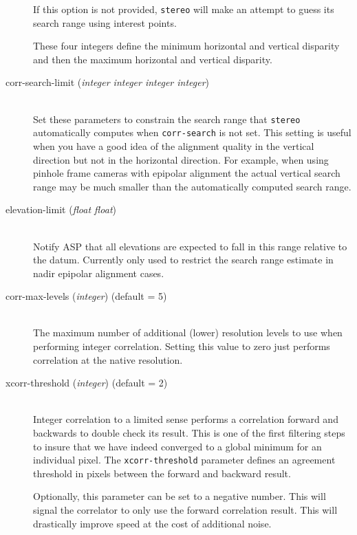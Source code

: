 \begin{description}
  If this option is not provided, \texttt{stereo} will make an
  attempt to guess its search range using interest points.

  These four integers define the minimum horizontal and
  vertical disparity and then the maximum horizontal and vertical
  disparity.

\item[corr-search-limit \textnormal{\small{(\emph{integer integer integer integer})}}] \hfill \\
  Set these parameters to constrain the search range that \texttt{stereo}
  automatically computes when \texttt{corr-search} is not set.
  This setting is useful when you have a good idea of the alignment quality
  in the vertical direction but not in the horizontal direction.  For example,
  when using pinhole frame cameras with epipolar alignment the actual vertical
  search range may be much smaller than the automatically computed search range.

\item[elevation-limit \textnormal{\small{(\emph{float float})}}] \hfill \\
  Notify ASP that all elevations are expected to fall in this range relative to
  the datum. Currently only used to restrict the search range estimate in 
  nadir epipolar alignment cases.

\item[corr-max-levels \textnormal{\small{(\emph{integer})}} (default = 5)] \hfill \\

  The maximum number of additional (lower) resolution levels to use when performing integer correlation.
  Setting this value to zero just performs correlation at the native resolution.

\item[xcorr-threshold \textnormal{\small{(\emph{integer})}} (default = 2)] \hfill \\

  Integer correlation to a limited sense performs a correlation
  forward and backwards to double check its result. This is one of the
  first filtering steps to insure that we have indeed converged to a
  global minimum for an individual pixel. The \texttt{xcorr-threshold}
  parameter defines an agreement threshold in pixels between the
  forward and backward result.

  Optionally, this parameter can be set to a negative number. This
  will signal the correlator to only use the forward correlation
  result. This will drastically improve speed at the cost of
  additional noise.


\end{description}
